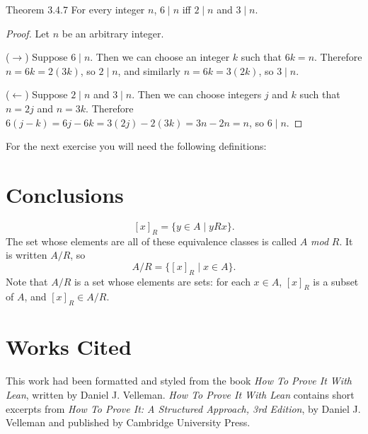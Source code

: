 \documentclass[
  letterpaper,
  DIV=11,
  numbers=noendperiod]{scrreprt}
\newenvironment{mdsk}
	{\medskip}
	{}
\newcommand{\excl}[1]{}
\theoremstyle{remark}
\begin{document}
\begin{nthm}{Theorem 3.4.7}
For every integer \(n\), \(6 \mid n\) iff \(2 \mid n\) and \(3 \mid n\).

\end{nthm}

\begin{proof}

Let \(n\) be an arbitrary integer.

(\(\to\)) Suppose \(6 \mid n\). Then we can choose an integer \(k\) such
that \(6k=n\). Therefore \(n = 6k = 2(3k)\), so \(2 \mid n\), and
similarly \(n = 6k = 3(2k)\), so \(3 \mid n\).

(\(\leftarrow\)) Suppose \(2 \mid n\) and \(3 \mid n\). Then we can
choose integers \(j\) and \(k\) such that \(n = 2j\) and \(n = 3k\).
Therefore \(6(j-k) = 6j - 6k = 3(2j) - 2(3k) = 3n - 2n = n\), so
\(6 \mid n\). \excl{~□}\qedhere

\end{proof}

\begin{mdsk}

\end{mdsk}

For the next exercise you will need the following definitions:


\hypertarget{conclusions}{%
\chapter{Conclusions}\label{conclusions}}

\[
[x]_R = \{y \in A \mid yRx\}.
\] The set whose elements are all of these equivalence classes is called
\(A\) \emph{mod} \(R\). It is written \(A/R\), so \[
A/R = \{[x]_R \mid x \in A\}.
\] Note that \(A/R\) is a set whose elements are sets: for each
\(x \in A\), \([x]_R\) is a subset of \(A\), and \([x]_R \in A/R\).


\hypertarget{works-cited}{%
\chapter{Works Cited}\label{works-cited}}

This work had been formatted and styled from the book \emph{How To Prove
It With Lean}, written by Daniel J. Velleman. \emph{How To Prove It With
Lean} contains short excerpts from \emph{How To Prove It: A Structured
Approach, 3rd Edition}, by Daniel J. Velleman and published by Cambridge
University Press.
\end{document}
